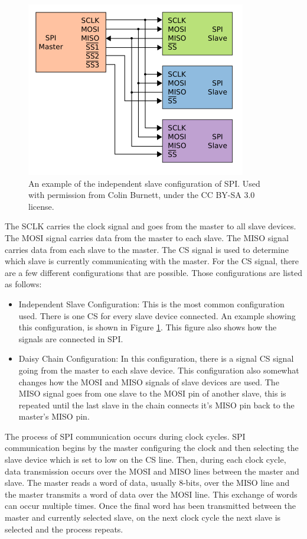 \begin{figure}
    \centering
    \includegraphics[scale=0.5]{figures/spi-three-slaves.png}
    \caption{An example of the independent slave configuration of SPI. Used with permission from Colin Burnett, under the CC BY-SA 3.0 license. \cite{spi-image}}
    \label{spi-three-slaves}
\end{figure}

The SCLK carries the clock signal and goes from the master to all slave devices. The MOSI signal carries data from the master to each slave. The MISO signal carries data from each slave to the master. The CS signal is used to determine which slave is currently communicating with the master. For the CS signal, there are a few different configurations that are possible. Those configurations are listed as follows:
\begin{itemize}
    \item Independent Slave Configuration: This is the most common configuration used. There is one CS for every slave device connected. An example showing this configuration, is shown in Figure \ref{spi-three-slaves}. This figure also shows how the signals are connected in SPI.
    \item Daisy Chain Configuration: In this configuration, there is a signal CS signal going from the master to each slave device. This configuration also somewhat changes how the MOSI and MISO signals of slave devices are used. The MISO signal goes from one slave to the MOSI pin of another slave, this is repeated until the last slave in the chain connects it's MISO pin back to the master's MISO pin.
\end{itemize}

The process of SPI communication occurs during clock cycles. SPI communication begins by the master configuring the clock and then selecting the slave device which is set to low on the CS line. Then, during each clock cycle, data transmission occurs over the MOSI and MISO lines between the master and slave. The master reads a word of data, usually 8-bits, over the MISO line and the master transmits a word of data over the MOSI line. This exchange of words can occur multiple times. Once the final word has been transmitted between the master and currently selected slave, on the next clock cycle the next slave is selected and the process repeats.

